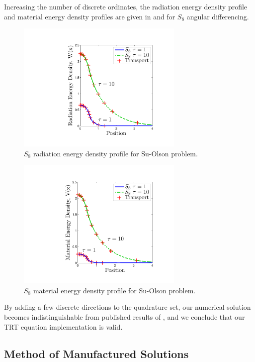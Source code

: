 Increasing the number of discrete ordinates, the radiation energy density profile and material energy density profiles are given in  and  for $S_8$ angular differencing.
\begin{figure}[!htp]
\centering
\includegraphics[width=8cm,trim=1.75in  0.5in 0.75in 0.5in,clip=true]{chapter6_grey_radtran/Dissertation_Data/Su_Olson_S8_Radiation_Energy.pdf}
\caption{$S_8$ radiation energy density profile for Su-Olson problem.}
\label{fig:su_olson_s8_rad}
\end{figure}
\begin{figure}[!hbp]
\centering
\includegraphics[width=8cm,trim=1.75in  0.5in 0.75in 0.5in,clip=true]{chapter6_grey_radtran/Dissertation_Data/Su_Olson_S8_Material_Energy.pdf}
\caption{$S_8$ material energy density profile for Su-Olson problem.}
\label{fig:su_olson_s8_mat}
\end{figure}
By adding a few discrete directions to the quadrature set, our numerical solution becomes indistinguishable from published results of \cite{su_olson_1}, and we conclude that our TRT equation implementation is valid.

\newpage

\subsection{Method of Manufactured Solutions}

